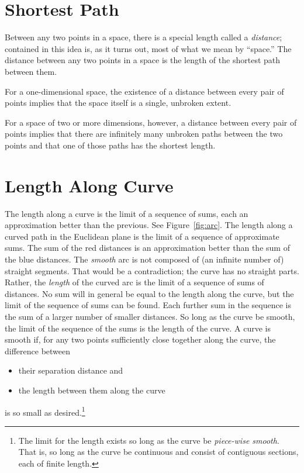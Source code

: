 \section{Shortest Path}

Between any two points in a space, there is a special length called a
\emph{distance}; contained in this idea is, as it turns out, most of what we
mean by ``space.'' The distance between any two points in a space is the length
of the shortest path between them.

For a one-dimensional space, the existence of a distance between every pair of
points implies that the space itself is a single, unbroken extent.

For a space of two or more dimensions, however, a distance between every pair
of points implies that there are infinitely many unbroken paths between the two
points and that one of those paths has the shortest length.

\section{Length Along Curve}

The length along a curve is the limit of a sequence of sums, each an
approximation better than the previous.  See Figure~\ref{fig:arc}.  The length
along a curved path in the Euclidean plane is the limit of a sequence of
approximate sums.  The sum of the red distances is an approximation better than
the sum of the blue distances.  The \emph{smooth} arc is not composed of (an
infinite number of) straight segments.  That would be a contradiction; the
curve has no straight parts.  Rather, the \emph{length} of the curved arc is
the limit of a sequence of sums of distances.  No sum will in general be equal
to the length along the curve, but the limit of the sequence of sums can be
found.  Each further sum in the sequence is the sum of a larger number of
smaller distances.  So long as the curve be smooth, the limit of the sequence
of the sums is the length of the curve.  A curve is smooth if, for any two
points sufficiently close together along the curve, the difference between
\begin{itemize}[noitemsep]
   \item their separation distance and
   \item the length between them along the curve
\end{itemize}
is so small as desired.\footnote{%
   The limit for the length exists so long as the curve be \emph{piece-wise
   smooth}.  That is, so long as the curve be continuous and consist of
   contiguous sections, each of finite length.%
}

